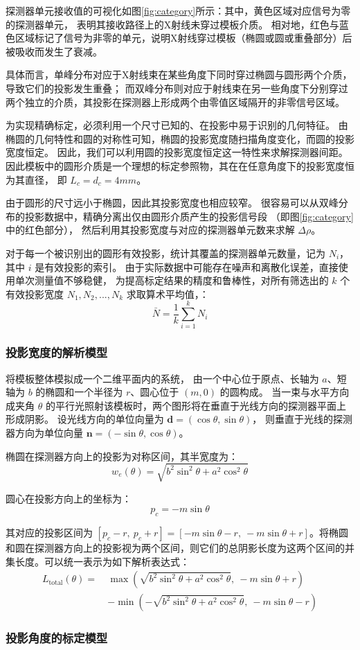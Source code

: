 探测器单元接收值的可视化如图\ref{fig:category}所示：其中，黄色区域对应信号为零的探测器单元，
表明其接收路径上的X射线未穿过模板介质。
相对地，红色与蓝色区域标记了信号为非零的单元，说明X射线穿过模板（椭圆或圆或重叠部分）后被吸收而发生了衰减。

具体而言，单峰分布对应于X射线束在某些角度下同时穿过椭圆与圆形两个介质，导致它们的投影发生重叠；
而双峰分布则对应于射线束在另一些角度下分别穿过两个独立的介质，其投影在探测器上形成两个由零值区域隔开的非零信号区域。

为实现精确标定，必须利用一个尺寸已知的、在投影中易于识别的几何特征。
由椭圆的几何特性和圆的对称性可知，椭圆的投影宽度随扫描角度变化，而圆的投影宽度恒定。
因此，我们可以利用圆的投影宽度恒定这一特性来求解探测器间距。
因此模板中的圆形介质是一个理想的标定参照物，其在在任意角度下的投影宽度恒为其直径，
即 $L_c = d_c = 4 mm$。

由于圆形的尺寸远小于椭圆，因此其投影宽度也相应较窄。
很容易可以从双峰分布的投影数据中，精确分离出仅由圆形介质产生的投影信号段
（即图\ref{fig:category}中的红色部分），
然后利用其投影宽度与对应的探测器单元数来求解 $\Delta\rho$。

对于每一个被识别出的圆形有效投影，统计其覆盖的探测器单元数量，记为 $N_i$，其中 $i$ 是有效投影的索引。
由于实际数据中可能存在噪声和离散化误差，直接使用单次测量值不够稳健，
为提高标定结果的精度和鲁棒性，对所有筛选出的 $k$ 个有效投影宽度 $N_1, N_2, ..., N_k$ 求取算术平均值，：
\begin{equation}
    \bar{N} = \frac{1}{k} \sum_{i=1}^{k} N_i
    \label{eq:average_N}
\end{equation}



\subsubsection{投影宽度的解析模型}
将模板整体模拟成一个二维平面内的系统，
由一个中心位于原点、长轴为 $a$、短轴为 $b$ 的椭圆和一个半径为 $r$、圆心位于 $(m, 0)$ 的圆构成。
当一束与水平方向成夹角 $\theta$ 的平行光照射该模板时，两个图形将在垂直于光线方向的探测器平面上形成阴影。
设光线方向的单位向量为 $\mathbf{d} = (\cos\theta, \sin\theta)$，
则垂直于光线的探测器方向为单位向量 $\mathbf{n} = (-\sin\theta, \cos\theta)$。

椭圆在探测器方向上的投影为对称区间，其半宽度为：
\[
w_e(\theta) = \sqrt{b^2 \sin^2\theta + a^2 \cos^2\theta}
\]

圆心在投影方向上的坐标为：
\[
p_c = -m \sin\theta
\]

其对应的投影区间为 $[p_c - r,\ p_c + r] = [-m \sin\theta - r,\ -m \sin\theta + r]$。将椭圆和圆在探测器方向上的投影视为两个区间，则它们的总阴影长度为这两个区间的并集长度。可以统一表示为如下解析表达式：
\begin{equation}
\begin{split}
L_{\text{total}}(\theta) =\ & \max\left( \sqrt{b^2 \sin^2\theta + a^2 \cos^2\theta},\ -m \sin\theta + r \right) \\
& - \min\left( -\sqrt{b^2 \sin^2\theta + a^2 \cos^2\theta},\ -m \sin\theta - r \right)
\end{split}
\end{equation}


\subsubsection{投影角度的标定模型}
